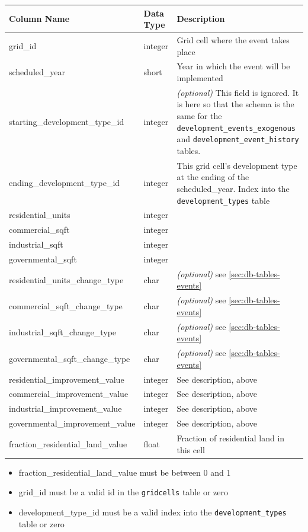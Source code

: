 \begin{tabular}{|p{2in}|l|p{3.5in}|}
\hline
\textbf{Column Name} & \textbf{Data Type} & \textbf{Description} \\
\hline
grid_id & integer & Grid cell where the event takes place  \\
\hline
scheduled_year &short & Year in which the event will be implemented  \\
\hline
starting_development_type_id & integer & \emph{(optional) }
This field is ignored. It is here so that the schema is the same for the
\verb|development_events_exogenous| and \verb|development_event_history| tables.   \\
\hline
ending_development_type_id & integer &  This grid cell's development type
at the ending of the scheduled_year. Index into the \verb|development_types|
table   \\
\hline
residential_units & integer & \\
\hline
commercial_sqft & integer & \\
\hline
industrial_sqft & integer & \\
\hline
governmental_sqft & integer & \\
\hline
residential_units_change_type & char & \emph{(optional) } see \ref{sec:db-tables-events}\\
\hline
commercial_sqft_change_type & char & \emph{(optional) } see \ref{sec:db-tables-events}\\
\hline
industrial_sqft_change_type & char & \emph{(optional) } see \ref{sec:db-tables-events}\\
\hline
governmental_sqft_change_type & char & \emph{(optional) } see \ref{sec:db-tables-events}\\
\hline
residential_improvement_value & integer & See description, above  \\
\hline
commercial_improvement_value & integer & See description, above  \\
\hline
industrial_improvement_value & integer & See description, above  \\
\hline
governmental_improvement_value & integer & See description, above  \\
\hline
fraction_residential_land_value & float & Fraction of residential land in this cell  \\
\hline

\end{tabular}

\begin{itemize} \tight
\item fraction_residential_land_value must be between 0 and 1
\item grid_id must be a valid id in the \verb|gridcells| table or zero
\item development_type_id must be a valid index into the \verb|development_types| table or zero
\end{itemize}


